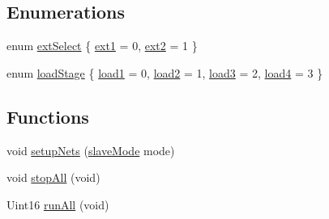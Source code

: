 \subsection*{Enumerations}
\begin{DoxyCompactItemize}
\item 
enum \hyperlink{a00027_a258413561252a6c94af200747272a9f3}{ext\-Select} \{ \hyperlink{a00027_a258413561252a6c94af200747272a9f3a6b8e8e9bb4b53b3fc029110541623a3c}{ext1} = 0, 
\hyperlink{a00027_a258413561252a6c94af200747272a9f3a6b3e8213ce7722257795b7a3ffb915fc}{ext2} = 1
 \}
\item 
enum \hyperlink{a00027_a2820f1e18d921d2f1e97d53404b9fbae}{load\-Stage} \{ \hyperlink{a00027_a2820f1e18d921d2f1e97d53404b9fbaeae319629172a300013df8b0149c386f96}{load1} = 0, 
\hyperlink{a00027_a2820f1e18d921d2f1e97d53404b9fbaea690fc43c88b8671aff6aed61a8a2f9c6}{load2} = 1, 
\hyperlink{a00027_a2820f1e18d921d2f1e97d53404b9fbaea861124cff343ddc4d2cc20dfe3ee7fa2}{load3} = 2, 
\hyperlink{a00027_a2820f1e18d921d2f1e97d53404b9fbaea94258908ecc1dedac8f08e7baf1156fc}{load4} = 3
 \}
\end{DoxyCompactItemize}
\subsection*{Functions}
\begin{DoxyCompactItemize}
\item 
void \hyperlink{a00027_a0ae5a77eff5aae0f7aead915fe68328b}{setup\-Nets} (\hyperlink{a00047_aca06f1f459e3a5a5af6da9c575e60754}{slave\-Mode} mode)
\item 
void \hyperlink{a00027_a776854c00eb8a571abbfb27130ba4849}{stop\-All} (void)
\item 
Uint16 \hyperlink{a00027_a3202c296892a1630de55722be3e52c41}{run\-All} (void)
\end{DoxyCompactItemize}
